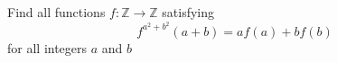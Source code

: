 Find all functions $f : \mathbb{Z}\rightarrow \mathbb{Z}$ satisfying
\[f^{a^{2} + b^{2}}(a+b) = af(a) +bf(b)\]for all integers $a$ and $b$